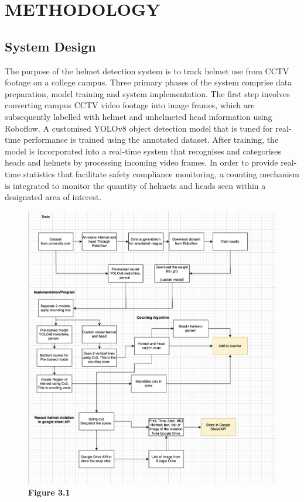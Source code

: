 \chapter{METHODOLOGY}
\section{System Design}

The purpose of the helmet detection system is to track helmet use from CCTV footage on a college campus. Three primary phases of the system comprise data preparation, model training and system implementation. The first step involves converting campus CCTV video footage into image frames, which are subsequently labelled with helmet and unhelmeted head information using Roboflow. A customised YOLOv8 object detection model that is tuned for real-time performance is trained using the annotated dataset. After training, the model is incorporated into a real-time system that recognises and categorises heads and helmets by processing incoming video frames. In order to provide real-time statistics that facilitate safety compliance monitoring, a counting mechanism is integrated to monitor the quantity of helmets and heads seen within a designated area of interest.


\begin{figure}[H] %
	
	\includegraphics[width=1\textwidth]{flowchart.jpg}
	\vspace{0.5em}
	\centering
	\noindent\textbf{Figure 3.1} \\
	\caption*{} %
	
	
\end{figure}


